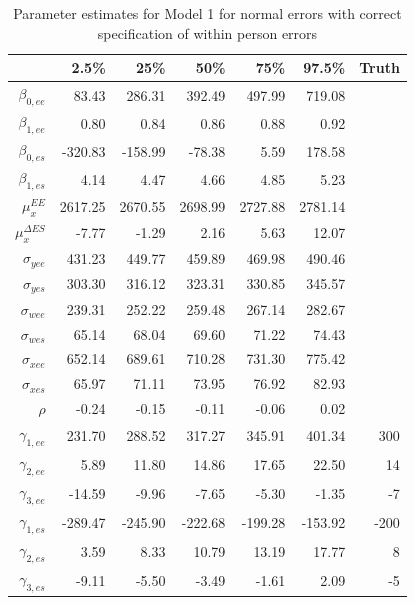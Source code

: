 \documentclass[11pt]{article}\usepackage[]{graphicx}\usepackage[]{color}
\begin{document}
\begin{table}[ht]
\centering
\begin{tabular}{rrrrrr|r}
  \hline
 & 2.5\% & 25\% & 50\% & 75\% & 97.5\% & Truth\\ 
  \hline
$\beta_{0,ee}$ & 83.43 & 286.31 & 392.49 & 497.99 & 719.08 \\ 
  $\beta_{1,ee}$ & 0.80 & 0.84 & 0.86 & 0.88 & 0.92 \\ 
  $\beta_{0,es}$ & -320.83 & -158.99 & -78.38 & 5.59 & 178.58 \\ 
  $\beta_{1,es}$ & 4.14 & 4.47 & 4.66 & 4.85 & 5.23 \\ 
  $\mu_x^{EE}$ & 2617.25 & 2670.55 & 2698.99 & 2727.88 & 2781.14 \\ 
  $\mu_x^{\Delta ES}$ & -7.77 & -1.29 & 2.16 & 5.63 & 12.07 \\ 
  $\sigma_{yee}$ & 431.23 & 449.77 & 459.89 & 469.98 & 490.46 \\ 
  $\sigma_{yes}$ & 303.30 & 316.12 & 323.31 & 330.85 & 345.57 \\ 
  $\sigma_{wee}$ & 239.31 & 252.22 & 259.48 & 267.14 & 282.67 \\ 
  $\sigma_{wes}$ & 65.14 & 68.04 & 69.60 & 71.22 & 74.43 \\ 
  $\sigma_{xee}$ & 652.14 & 689.61 & 710.28 & 731.30 & 775.42 \\ 
  $\sigma_{xes}$ & 65.97 & 71.11 & 73.95 & 76.92 & 82.93 \\ 
  $\rho$ & -0.24 & -0.15 & -0.11 & -0.06 & 0.02 \\ 
  $\gamma_{1,ee}$ & 231.70 & 288.52 & 317.27 & 345.91 & 401.34 & 300\\ 
  $\gamma_{2,ee}$ & 5.89 & 11.80 & 14.86 & 17.65 & 22.50 & 14\\ 
  $\gamma_{3,ee}$ & -14.59 & -9.96 & -7.65 & -5.30 & -1.35 & -7\\ 
  $\gamma_{1,es}$ & -289.47 & -245.90 & -222.68 & -199.28 & -153.92 &-200 \\ 
  $\gamma_{2,es}$ & 3.59 & 8.33 & 10.79 & 13.19 & 17.77 & 8\\ 
  $\gamma_{3,es}$ & -9.11 & -5.50 & -3.49 & -1.61 & 2.09 & -5\\ 
   \hline
\end{tabular}
\caption{Parameter estimates for Model 1 for normal errors with correct specification of within person errors}
\label{m1wpestimates}
\end{table}
\end{document}
